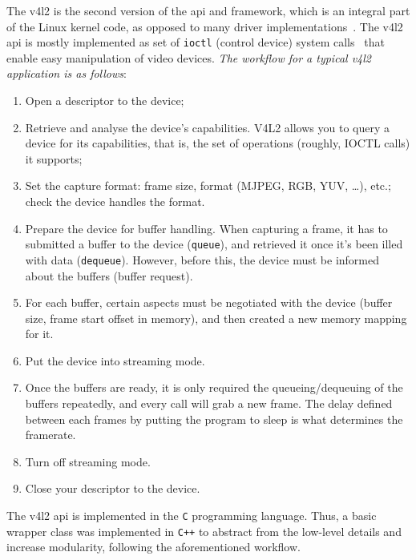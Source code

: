 The \gls{v4l2} is the second version of the \gls{api} and framework, which is an
integral part of the Linux kernel code, as opposed to many driver
implementations~\cite{v4l2-headers}. The \gls{v4l2} \gls{api} is mostly
implemented as set of \texttt{ioctl} (control device) system
calls~\cite{kerrisk2010linux} that enable easy manipulation of video devices.
\emph{The workflow for a typical \gls{v4l2} application is as follows}:
\begin{enumerate}
\item Open a descriptor to the device;
\item Retrieve and analyse the device's capabilities. V4L2 allows you to query a
  device for its capabilities, that is, the set of operations (roughly, IOCTL
  calls) it supports;
\item Set the capture format: frame size, format (MJPEG, RGB, YUV, \ldots),
  etc.; check the device handles the format.
\item Prepare the device for buffer handling. When capturing a frame, it has
  to submitted a buffer to the device (\texttt{queue}), and retrieved it once
  it's been illed with data (\texttt{dequeue}). However, before this, the device
  must be informed about the buffers (buffer request).
\item For each buffer, certain aspects must be negotiated with
  the device (buffer size, frame start offset in memory), and then created a new
  memory mapping for it.
\item Put the device into streaming mode.
\item Once the buffers are ready, it is only required the queueing/dequeuing
  of the buffers repeatedly, and every call will grab a new frame. The delay
  defined between each frames by putting the program to sleep is what
  determines the framerate.
\item Turn off streaming mode.
\item Close your descriptor to the device.
\end{enumerate}

The \gls{v4l2} \gls{api} is implemented in the \texttt{C} programming
language. Thus, a basic wrapper class was implemented in \texttt{C++} to
abstract from the low-level details and increase modularity, following the
aforementioned workflow.

